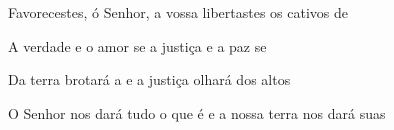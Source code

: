 \begin{greenumerate}
  \item {}Favorecestes, ó Senhor, a vossa  libertastes os cativos de 

  \item {}A verdade e o amor se  a justiça e a paz se 

  \item {}Da terra brotará a  e a justiça olhará dos altos 

  \item {}O Senhor nos dará tudo o que é  e a nossa terra nos dará suas 
\end{greenumerate}